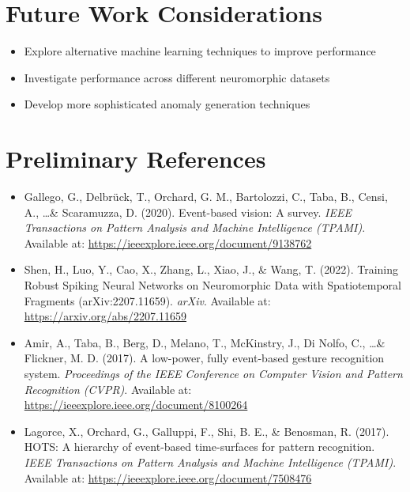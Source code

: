 \documentclass[12pt,a4paper]{article}
\begin{document}
\section{Future Work Considerations}

\begin{itemize}
    \item Explore alternative machine learning techniques to improve performance
    \item Investigate performance across different neuromorphic datasets
    \item Develop more sophisticated anomaly generation techniques
\end{itemize}

\section{Preliminary References}

\begin{itemize}
    \item Gallego, G., Delbrück, T., Orchard, G. M., Bartolozzi, C., Taba, B., Censi, A., \ldots \& Scaramuzza, D. (2020). Event-based vision: A survey. \emph{IEEE Transactions on Pattern Analysis and Machine Intelligence (TPAMI)}. Available at: \url{https://ieeexplore.ieee.org/document/9138762}
    
    \item Shen, H., Luo, Y., Cao, X., Zhang, L., Xiao, J., \& Wang, T. (2022). Training Robust Spiking Neural Networks on Neuromorphic Data with Spatiotemporal Fragments (arXiv:2207.11659). \emph{arXiv}. Available at: \url{https://arxiv.org/abs/2207.11659}
    
    \item Amir, A., Taba, B., Berg, D., Melano, T., McKinstry, J., Di Nolfo, C., \ldots \& Flickner, M. D. (2017). A low-power, fully event-based gesture recognition system. \emph{Proceedings of the IEEE Conference on Computer Vision and Pattern Recognition (CVPR)}. Available at: \url{https://ieeexplore.ieee.org/document/8100264}
    
    \item Lagorce, X., Orchard, G., Galluppi, F., Shi, B. E., \& Benosman, R. (2017). HOTS: A hierarchy of event-based time-surfaces for pattern recognition. \emph{IEEE Transactions on Pattern Analysis and Machine Intelligence (TPAMI)}. Available at: \url{https://ieeexplore.ieee.org/document/7508476}
\end{itemize}
\end{document}
